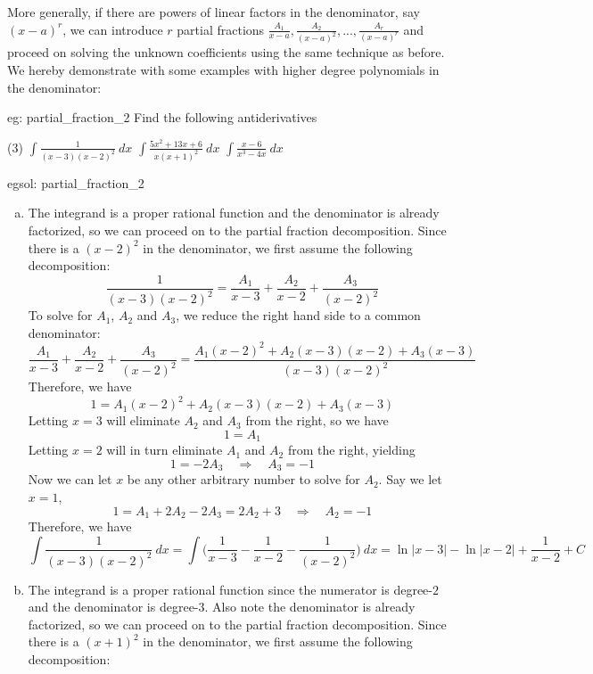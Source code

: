 More generally, if there are powers of linear factors in the denominator, say $(x-a)^r$, we can introduce $r$ partial fractions $\frac{A_1}{x-a}, \frac{A_2}{(x-a)^2}, ..., \frac{A_r}{(x-a)^r}$ and proceed on solving the unknown coefficients using the same technique as before.  We hereby demonstrate with some examples with higher degree polynomials in the denominator:

\begin{eg}[]{eg: partial_fraction_2}
    Find the following antiderivatives
    \begin{tasks}(3)
        \task $\int \frac{1}{(x-3)(x-2)^2}~dx$
        \task $\int \frac{5x^2+13x+6}{x(x+1)^2}~dx$
        \task $\int \frac{x-6}{x^3-4x}~dx$
    \end{tasks}
\end{eg}
\begin{egsol}[]{egsol: partial_fraction_2}
    \begin{enumerate}[a)]
        \item The integrand is a proper rational function and the denominator is already factorized, so we can proceed on to the partial fraction decomposition.  Since there is a $(x-2)^2$ in the denominator, we first assume the following decomposition:
        \[\frac{1}{(x-3)(x-2)^2} = \frac{A_1}{x-3} + \frac{A_2}{x-2} + \frac{A_3}{(x-2)^2}\]
        To solve for $A_1$, $A_2$ and $A_3$, we reduce the right hand side to a common denominator:
        \[\frac{A_1}{x-3} + \frac{A_2}{x-2} + \frac{A_3}{(x-2)^2} = \frac{A_1(x-2)^2+A_2(x-3)(x-2)+A_3(x-3)}{(x-3)(x-2)^2}\]
        Therefore, we have
        \[1 = A_1(x-2)^2+A_2(x-3)(x-2)+A_3(x-3)\]
        Letting $x = 3$ will eliminate $A_2$ and $A_3$ from the right, so we have 
        \[1 = A_1\]
        Letting $x = 2$ will in turn eliminate $A_1$ and $A_2$ from the right, yielding
        \[1 = -2A_3 \quad \Rightarrow \quad A_3 = -1\]
        Now we can let $x$ be any other arbitrary number to solve for $A_2$.  Say we let $x=1$,
        \[1 = A_1 + 2A_2 - 2A_3 = 2A_2 + 3 \quad \Rightarrow \quad A_2 = -1\]
        Therefore, we have 
        \[\int \frac{1}{(x-3)(x-2)^2}~dx = \int \Big(\frac{1}{x-3}-\frac{1}{x-2}-\frac{1}{(x-2)^2}\Big)~dx = \ln|x-3| - \ln|x-2| + \frac{1}{x-2} + C\]
        \item The integrand is a proper rational function since the numerator is degree-$2$ and the denominator is degree-$3$.  Also note the denominator is already factorized, so we can proceed on to the partial fraction decomposition.  Since there is a $(x+1)^2$ in the denominator, we first assume the following decomposition:

\end{enumerate}
\end{egsol}
